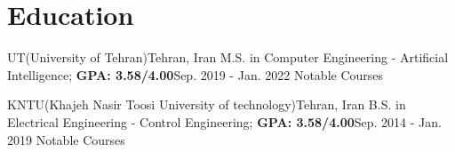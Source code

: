 
\section{Education}
  \vspace{3pt}
  \resumeSubHeadingListStart
    
    
      \resumeEducationHeading
      {UT(University of Tehran)}{Tehran, Iran}
      {M.S. in Computer Engineering - Artificial Intelligence; \textbf{GPA: 3.58/4.00}}{Sep. 2019 - Jan. 2022}
      {Notable Courses}{}
      \resumeSubHeadingListStart
      \small{\item{}}
      \resumeSubHeadingListEnd

      \resumeEducationHeading
      {KNTU(Khajeh Nasir Toosi University of technology)}{Tehran, Iran}
      {B.S. in Electrical Engineering - Control Engineering; \textbf{GPA: 3.58/4.00}}{Sep. 2014 - Jan. 2019}
      {Notable Courses}{}
      \resumeSubHeadingListStart
      \small{\item{}}
      \resumeSubHeadingListEnd
    
  \resumeSubHeadingListEnd